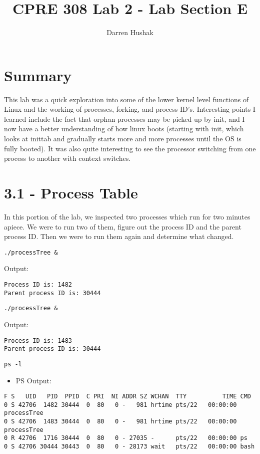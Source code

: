 \documentclass[11pt]{report}
\author{Darren Hushak}
\title{CPRE 308 Lab 2 - Lab Section E}
\date{}
\begin{document}
\maketitle
\section*{Summary}
This lab was a quick exploration into some of the lower kernel level functions of Linux and the working of processes, forking, and process ID's. Interesting points I learned include the fact that orphan processes may be picked up by init, and I now have a better understanding of how linux boots (starting with init, which looks at inittab and gradually starts more and more processes until the OS is fully booted). It was also quite interesting to see the processor switching from one process to another with context switches.

\newpage
\section*{3.1 - Process Table}

In this portion of the lab, we inspected two processes which run for two minutes apiece. We were to run two of them, figure out the process ID and the parent process ID. Then we were to run them again and determine what changed.

\begin{verbatim}
./processTree &
\end{verbatim}

Output:
\begin{verbatim}
Process ID is: 1482
Parent process ID is: 30444
\end{verbatim}

\begin{verbatim}
./processTree &
\end{verbatim}

Output:
\begin{verbatim}
Process ID is: 1483
Parent process ID is: 30444
\end{verbatim}

\begin{verbatim}
ps -l
\end{verbatim}
\begin{itemize}
\item PS Output:
\end{itemize}
\begin{verbatim}
F S   UID   PID  PPID  C PRI  NI ADDR SZ WCHAN  TTY          TIME CMD
0 S 42706  1482 30444  0  80   0 -   981 hrtime pts/22   00:00:00 processTree
0 S 42706  1483 30444  0  80   0 -   981 hrtime pts/22   00:00:00 processTree
0 R 42706  1716 30444  0  80   0 - 27035 -      pts/22   00:00:00 ps
0 S 42706 30444 30443  0  80   0 - 28173 wait   pts/22   00:00:00 bash
\end{verbatim}
\end{document}
